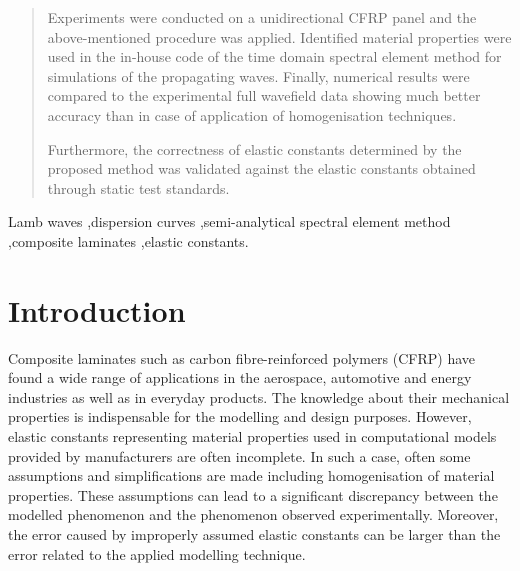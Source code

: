 \documentclass[preprint,12pt]{elsarticle}
\begin{document}
\begin{frontmatter}
\begin{abstract}
Experiments were conducted on a unidirectional CFRP panel and the above-mentioned procedure was applied. 
Identified material properties were used in the in-house code of the time domain spectral element method for simulations of the propagating waves. 
Finally, numerical results were compared to the experimental full wavefield data showing much better accuracy than in case of application of homogenisation techniques.

Furthermore, the correctness of elastic constants determined by the proposed method was validated against the elastic constants obtained through static test standards.
\end{abstract}
		
		\begin{keyword}
			Lamb waves \sep dispersion curves \sep semi-analytical spectral element method \sep composite laminates \sep elastic constants.
			
			
		\end{keyword}
		
	\end{frontmatter}
	
	
\section{Introduction}
Composite laminates such as carbon fibre-reinforced polymers (CFRP) have found a wide range of applications in the aerospace, automotive and energy industries as well as in everyday products. The knowledge about their mechanical properties is indispensable for the modelling and design purposes.
However, elastic constants representing material properties used in computational models provided by manufacturers are often incomplete. 
In such a case, often some assumptions and simplifications are made including homogenisation of material properties. 
These assumptions can lead to a significant discrepancy between the modelled phenomenon and the phenomenon observed experimentally.
Moreover, the error caused by improperly assumed elastic constants can be larger than the error related to the applied modelling technique.	
\end{document}
